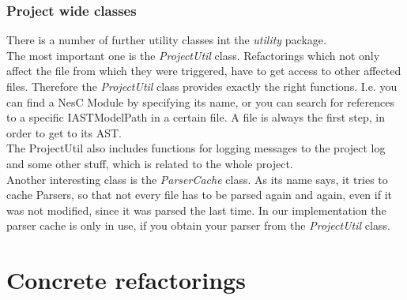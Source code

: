 \documentclass[a4paper,10pt]{report}
\begin{document}
\subsection{Project wide classes}
There is a number of further utility classes int the {\it utility} package.\\
The most important one is the {\it ProjectUtil} class.
Refactorings which not only affect the file from which they were triggered, have to get access to other affected files.
Therefore the {\it ProjectUtil} class provides exactly the right functions.
I.e. you can find a NesC Module by specifying its name, or you can search for references to a specific {IASTModelPath} in a certain file.
A file is always the first step, in order to get to its AST.\\
The {ProjectUtil} also includes functions for logging messages to the project log and some other stuff, which is related to the whole project.\\
Another interesting class is the {\it ParserCache} class.
As its name says, it tries to cache Parsers, so that not every file has to be parsed again and again, even if it was not modified, since it was parsed the last time.
In our implementation the parser cache is only in use, if you obtain your parser from the {\it ProjectUtil} class. 

\chapter{Concrete refactorings}
\label{concreteRefactorings}
\end{document}
